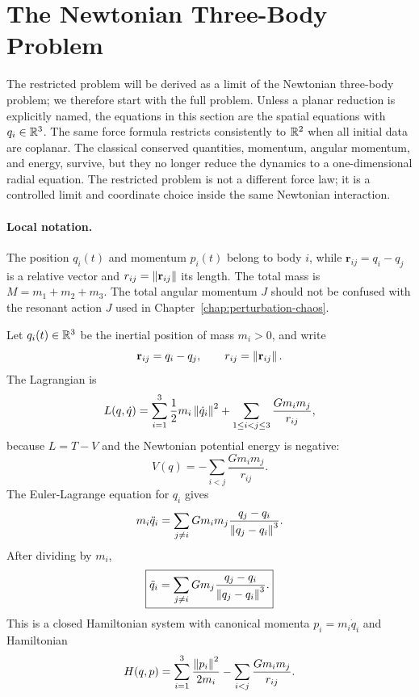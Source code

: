 \section{The Newtonian Three-Body Problem}
\label{sec:newtonian-three-body-problem}

The restricted problem will be derived as a limit of the Newtonian three-body
problem; we therefore start with the full problem.  Unless a planar reduction
is explicitly named, the equations in this section are the spatial equations
with \(q_i\in\mathbb{R}^3\).  The same force formula restricts consistently to
\(\mathbb{R}^2\) when all initial data are coplanar. The classical conserved
quantities, momentum, angular momentum, and energy, survive, but they no longer
reduce the dynamics to a one-dimensional radial equation. The restricted
problem is not a different force law; it is a controlled limit and coordinate
choice inside the same Newtonian interaction.

\paragraph{Local notation.}
The position \(q_i(t)\) and momentum \(p_i(t)\) belong to body \(i\), while
\(\mathbf r_{ij}=q_i-q_j\) is a relative vector and
\(r_{ij}=\left\lVert \mathbf r_{ij}\right\rVert\) its length.  The total mass is
\(M=m_1+m_2+m_3\).  The total angular
momentum \(J\) should not be confused with the resonant action \(J\) used in
Chapter~\ref{chap:perturbation-chaos}.

Let \(q_i(t)\in\mathbb{R}^3\) be the inertial position of mass
\(m_i>0\), and write
\[
  \mathbf r_{ij}=q_i-q_j,\qquad r_{ij}=\left\lVert \mathbf r_{ij}\right\rVert.
\]
The Lagrangian is
\[
  L(q,\dot q)
  =
  \sum_{i=1}^3 \frac12 m_i\left\lVert \dot q_i\right\rVert^2
  +
  \sum_{1\leq i<j\leq 3}\frac{Gm_im_j}{r_{ij}},
\]
because \(L=T-V\) and the Newtonian potential energy is negative:
\[
  V(q)=-\sum_{i<j}\frac{Gm_im_j}{r_{ij}}.
\]
The Euler-Lagrange equation for \(q_i\) gives
\[
  m_i\ddot q_i
  =
  \sum_{j\neq i}
  Gm_im_j\frac{q_j-q_i}{\left\lVert q_j-q_i\right\rVert^3}.
\]
After dividing by \(m_i\),
\[
  \boxed{
  \ddot q_i
  =
  \sum_{j\neq i}
  Gm_j\frac{q_j-q_i}{\left\lVert q_j-q_i\right\rVert^3}.
  }
\]
This is a closed Hamiltonian system with canonical momenta \(p_i=m_i\dot q_i\)
and Hamiltonian
\[
  H(q,p)
  =
  \sum_{i=1}^3\frac{\left\lVert p_i\right\rVert^2}{2m_i}
  -
  \sum_{i<j}\frac{Gm_im_j}{r_{ij}}.
\]


